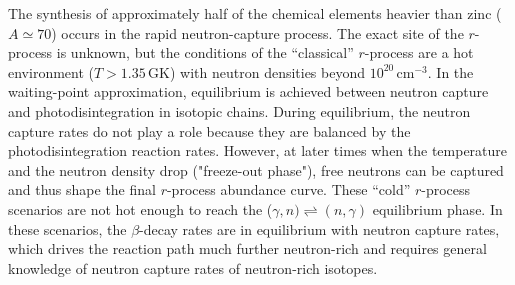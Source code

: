 The synthesis of approximately half of the chemical elements heavier than zinc ($A \simeq 70$) occurs in the rapid neutron-capture process.
The exact site of the $r$-process is unknown, but the conditions of 
the ``classical'' $r$-process %
are a hot environment ($T> 1.35$\,GK) with neutron densities beyond %
$10^{20}$\,cm$^{-3}$. %
 In the waiting-point approximation, equilibrium is achieved between neutron capture and photodisintegration %
 in isotopic chains. %
 During equilibrium, the neutron capture rates do not play a role %
because they are balanced by the photodisintegration reaction rates. 
However, at later %
 times when 
the temperature and the neutron density drop ("freeze-out phase"), free neutrons %
can be captured and thus shape the final $r$-process abundance curve.
These %
 ``cold'' $r$-process scenarios
 are not hot enough to %
 reach the ($\gamma,n)\rightleftharpoons(n,\gamma)$ equilibrium phase. In these scenarios, the $\beta$-decay rates are in equilibrium with neutron capture rates, which drives the reaction path much further neutron-rich and requires general knowledge of neutron capture rates of neutron-rich isotopes.

